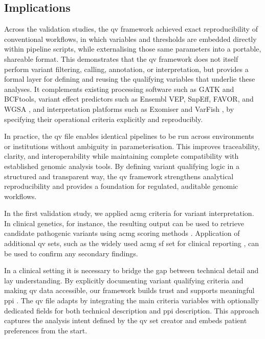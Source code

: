 \subsection{Implications}

Across the validation studies, the \ac{qv} framework achieved exact reproducibility of conventional workflows, in which variables and thresholds are embedded directly within pipeline scripts, while externalising those same parameters into a portable, shareable format. This demonstrates that the \ac{qv} framework does not itself perform variant filtering, calling, annotation, or interpretation, but provides a formal layer for defining and reusing the qualifying variables that underlie these analyses. It complements existing processing software such as GATK and BCFtools, variant effect predictors such as Ensembl VEP, SnpEff, FAVOR, and WGSA \cite{2024riccioVariantEffectPredictors}, and interpretation platforms such as Exomiser and VarFish \cite{2020ciprianiImprovedPhenotypeDrivenTool, 2020holtgreweVarFishComprehensiveDNA}, by specifying their operational criteria explicitly and reproducibly.

In practice, the \ac{qv} file enables identical pipelines to be run across environments or institutions without ambiguity in parameterisation. This improves traceability, clarity, and interoperability while maintaining complete compatibility with established genomic analysis tools. By defining variant qualifying logic in a structured and transparent way, the \ac{qv} framework strengthens analytical reproducibility and provides a foundation for regulated, auditable genomic workflows.

In the first validation study, we applied \ac{acmg} criteria for variant interpretation. In clinical genetics, for instance, the resulting output can be used to retrieve candidate pathogenic variants using \ac{acmg} scoring methods \cite{richards2015standards, tavtigian2020fitting}.
Application of additional \ac{qv} sets, such as the widely used \ac{acmg} \ac{sf} set for clinical reporting \cite{miller2023acmg}, can be used to confirm any secondary findings.

In a clinical setting it is necessary to bridge the gap between technical detail and lay understanding. By explicitly documenting variant qualifying criteria and making \ac{qv} data accessible, our framework builds trust and supports meaningful \ac{ppi} \cite{morris_answer_2011}. The \ac{qv} file adapts by integrating the main criteria variables with optionally dedicated fields for both technical description and \ac{ppi} description. This approach captures the analysis intent defined by the \ac{qv} set creator and embeds patient preferences from the start. 

